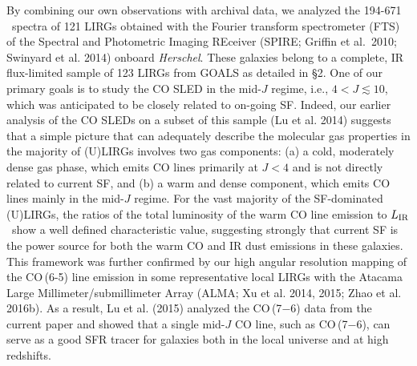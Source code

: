 \documentclass[preprint]{aastex}
\newcommand{\LIR}{\mbox{$L_{\rm IR}$}}
\begin{document}
By combining our own observations with archival data, we analyzed the 194-671 
\micron\ spectra of 121 LIRGs obtained with the Fourier transform spectrometer 
(FTS) of the Spectral and Photometric Imaging REceiver (SPIRE; Griffin et al.~2010;
Swinyard et al. 2014) onboard {\it Herschel}.  These galaxies belong to a complete,
IR flux-limited sample of 123 LIRGs from GOALS as detailed in \S2.  One of our 
primary goals is to study the CO SLED in the mid-$J$ regime, i.e., $4 < J \lesssim 
10$, which was anticipated to be closely related to on-going SF.  Indeed, our 
earlier analysis of the CO SLEDs on a subset of this sample (Lu et al. 2014)
suggests that a simple picture that can adequately describe the molecular gas 
properties in the majority of (U)LIRGs involves two gas components: 
(a) a cold, moderately dense gas phase, which emits CO lines primarily at 
$J < 4$ and is not directly related to current SF, and (b) a warm and dense 
component, which emits CO lines mainly in the mid-$J$ regime.  For the vast majority 
of the SF-dominated (U)LIRGs, the ratios 
of the total luminosity of the warm CO line emission to \LIR\ show a well defined 
characteristic value, suggesting strongly that current SF is the power source for 
both the warm CO and IR dust emissions in these galaxies.  This framework was 
further confirmed by our high angular resolution mapping of the CO\,(6-5) line 
emission in some representative local LIRGs with the Atacama Large 
Millimeter/submillimeter Array (ALMA; Xu et al. 2014, 2015; Zhao et al. 2016b). 
As a result, Lu et al. (2015) analyzed the CO\,(7$-$6) data from the current
paper and showed that a single mid-$J$ CO line, such as CO\,(7$-$6), can serve 
as a good SFR tracer for galaxies both in the local universe and at high redshifts.

  
\end{document}

